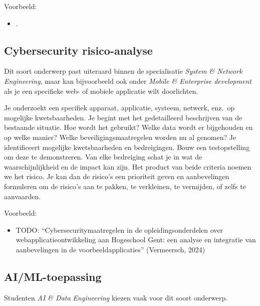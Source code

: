 Voorbeeld:

\begin{itemize}
  \item {} \autocite{VanDerPlaetsen2013}.
\end{itemize}

\subsection{Cybersecurity risico-analyse}%
\label{ssec:onderwerp_types_cybersecurity_risico_analyse}

Dit soort onderwerp past uiteraard binnen de specialisatie \emph{System \& Network Engineering}, maar kan bijvoorbeeld ook onder \emph{Mobile \& Enterprise development} als je een specifieke web- of mobiele applicatie wilt doorlichten.

Je onderzoekt een specifiek apparaat, applicatie, systeem, netwerk, enz.\ op mogelijke kwetsbaarheden. Je begint met het gedetailleerd beschrijven van de bestaande situatie. Hoe wordt het gebruikt? Welke data wordt er bijgehouden en op welke manier? Welke beveiligingsmaatregelen worden nu al genomen? Je identificeert mogelijke kwetsbaarheden en bedreigingen. Bouw een testopstelling om deze te demonstreren. Van elke bedreiging schat je in wat de waarschijnlijkheid en de impact kan zijn. Het product van beide criteria noemen we het risico. Je kan dan de risico's een prioriteit geven en aanbevelingen formuleren om de risico's aan te pakken, te verkleinen, te vermijden, of zelfs te aanvaarden.

Voorbeeld:

\begin{itemize}
  \item TODO: ``Cybersecuritymaatregelen in de opleidingsonderdelen over webapplicatieontwikkeling aan Hogeschool Gent: een analyse en integratie van aanbevelingen in de voorbeeldapplicaties'' (Vermeersch, 2024)
\end{itemize}

\subsection{AI/ML-toepassing}%
\label{ssec:onderwerp_types_ml_toepassing}

Studenten \emph{AI \& Data Engineering} kiezen vaak voor dit soort onderwerp.

